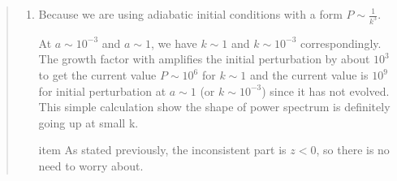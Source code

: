 \documentclass{article}
\begin{document}
\begin{quotation}
{\begin{enumerate}
Figure \ref{fig:CPL_Supp_QFactors} has a region $k<3.3 * 10^{-4}$ that is corresponding to scale factor $a>1$. So I give another two plots figure \ref{fig:CPL_Supp_QFactors_Cut} and \ref{fig:CPL_Supp_QFactors_Detail}. The same thing is done for power spectrum.

The power spectrum is consistent with the Hubble distance figure: larger Hubble distance generates weaker power.




\item
Because we are using adiabatic initial conditions with a form $P\sim \frac{1}{k^3}$.

At $a\sim 10^{-3}$ and $a\sim 1$, we have $k\sim 1$ and $k\sim 10^{-3}$ correspondingly. The growth factor with amplifies the initial perturbation by about $10^3$ to get the current value $P\sim 10^6$ for $k\sim 1$ and the current value is $10^9$ for initial perturbation at $a\sim 1$ (or $k\sim 10^{-3}$) since it has not evolved. This simple calculation show the shape of power spectrum is definitely going up at small k.

item
As stated previously, the inconsistent part is $z<0$, so there is no need to worry about.





\end{enumerate}



}
\end{quotation}







\end{document}
